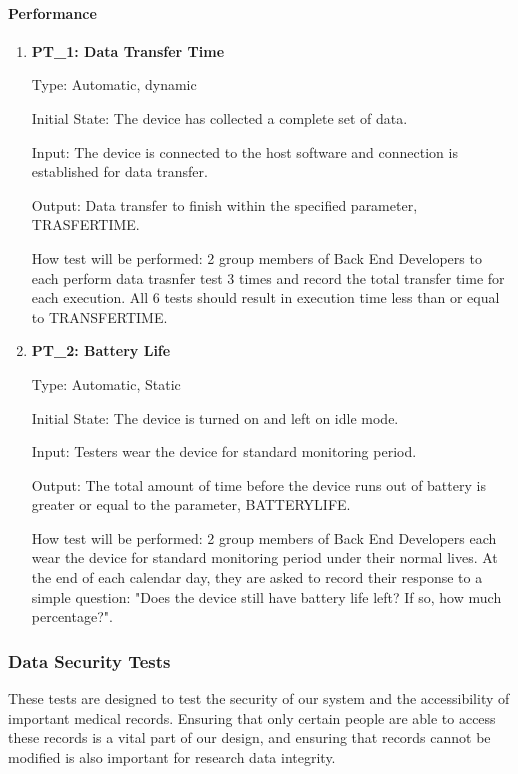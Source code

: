 \documentclass[12pt, titlepage]{article}
\begin{document}
\begin{enumerate}
\paragraph{Performance}
\begin{enumerate}
\item\textbf{{PT\_1: Data Transfer Time\\}}

Type: Automatic, dynamic
					
Initial State: The device has collected a complete set of data.
					
Input: The device is connected to the host software and connection is established for data transfer.
					
Output: Data transfer to finish within the specified parameter, TRASFERTIME.
					
How test will be performed: 2 group members of Back End Developers to each perform data trasnfer test 3 times and record the total transfer time for each execution. All 6 tests should result in execution time less than or equal to TRANSFERTIME.

\item\textbf{{PT\_2: Battery Life\\}}

Type: Automatic, Static
					
Initial State: The device is turned on and left on idle mode.
					
Input: Testers wear the device for standard monitoring period.
					
Output: The total amount of time before the device runs out of battery is greater or equal to the parameter, BATTERYLIFE.
					
How test will be performed: 2 group members of Back End Developers each wear the device for standard monitoring period under their normal lives. At the end of each calendar day, they are asked to record their response to a simple question: "Does the device still have battery life left? If so, how much percentage?". 

\end{enumerate}

\subsubsection{Data Security Tests}

These tests are designed to test the security of our system and the accessibility of important medical records. Ensuring that only certain people are able to access these records is a vital part of our design, and ensuring that records cannot be modified is also important for research data integrity. 


\end{enumerate}
\end{document}
